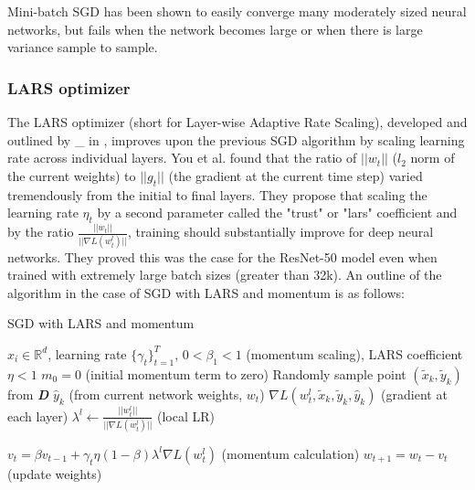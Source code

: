 Mini-batch SGD has been shown to easily converge many moderately sized neural networks, but fails when the network becomes large or when there is large variance sample to sample.
\subsubsection{LARS optimizer}

The LARS optimizer (short for Layer-wise Adaptive Rate Scaling), developed and outlined by \_ in \cite{ginsburg2018large}, improves upon the previous SGD algorithm by scaling learning rate across individual layers. You et al. found that the ratio of $||w_t||$ ($l_2$ norm of the current weights) to $||g_t||$ (the gradient at the current time step) varied tremendously from the initial to final layers. They propose that scaling the learning rate $\eta_t$ by a second parameter called the "trust" or "lars" coefficient and by the ratio $\frac{||w_t||}{||\nabla L(w_t^l)||}$, training should substantially improve for deep neural networks. They proved this was the case for the ResNet-50 model even when trained with extremely large batch sizes (greater than 32k)\cite{ginsburg2018large}. An outline of the algorithm in the case of SGD with LARS and momentum is as follows:
\begin{minipage}[b]{.48\textwidth}
\begin{algorithm}[H]\small
	\caption{SGD with LARS and momentum \cite{ginsburg2018large}}
	\label{alg:lars}
	\begin{algorithmic}
	    \vspace{3pt}
		 $x_i \in \mathbb{R}^d$, learning rate $\{\gamma_t\}_{t=1}^T$, $0 < \beta_{1} < 1$ (momentum scaling), LARS coefficient $\eta <1$
		\vspace{3pt}
		\STATE $m_{0} = 0$ (initial momentum term to zero)
		\vspace{2pt}
		\STATE Randomly sample point $(\tilde x_k,\tilde y_k)$ from \textbf{\textit{D}}
        \vspace{3pt}
		\STATE $\hat y_k$ (from current network weights, $w_t$)
		\vspace{2pt}
        \STATE $\nabla L(w_t^l,\tilde x_k,\tilde y_k,\hat y_k)$ (gradient at each layer)
        \vspace{3pt}
        \STATE $\lambda^l \gets \frac{||w_t^l||}{||\nabla L(w_t^l)||}$ (local LR)
        \vspace{3pt}
        
        \STATE $v_{t} = \beta v_{t-1} + \gamma_t\eta(1 - \beta)\lambda^l\nabla L(w_t^l)$ (momentum calculation)
        \vspace{3pt}
		\STATE $w_{t+1} = w_{t} - v_t$ (update weights)
		\vspace{3pt}
		\ENDFOR
	\end{algorithmic}
\end{algorithm}
\end{minipage}\hfill%
